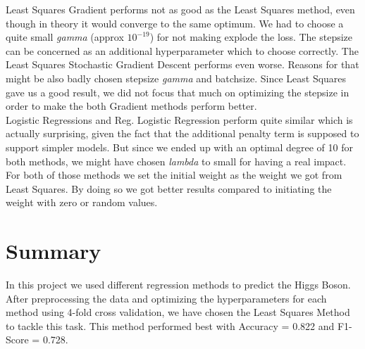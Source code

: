 \documentclass[10pt,conference,compsocconf]{IEEEtran}
\begin{document}
 
Least Squares Gradient performs not as good as the Least Squares method, even though in theory it would converge to the same optimum. We had to choose a quite small \textit{gamma} (approx $10^{-19}$) for not making explode the loss. The stepsize can be concerned as an additional hyperparameter which to choose correctly. The Least Squares Stochastic Gradient Descent performs even worse. Reasons for that might be also badly chosen stepsize \textit{gamma} and batchsize.
Since Least Squares gave us a good result, we did not focus that much on optimizing the stepsize in order to make the both Gradient methods perform better. \\
Logistic Regressions and Reg. Logistic Regression perform quite similar which is actually surprising, given the fact that the additional penalty term is supposed to support simpler models. But since we ended up with an optimal degree of 10 for both methods, we might have chosen \textit{lambda} to small for having a real impact. For both of those methods we set the initial weight as the weight we got from Least Squares. By doing so we got better results compared to initiating the weight with zero or random values. 


\section{Summary}

In this project we used different regression methods to predict the Higgs Boson. After preprocessing the data and optimizing the hyperparameters for each method using 4-fold cross validation, we have chosen the Least Squares Method to tackle this task. This method performed best with Accuracy = 0.822 and F1-Score = 0.728.



%
%
\end{document}
